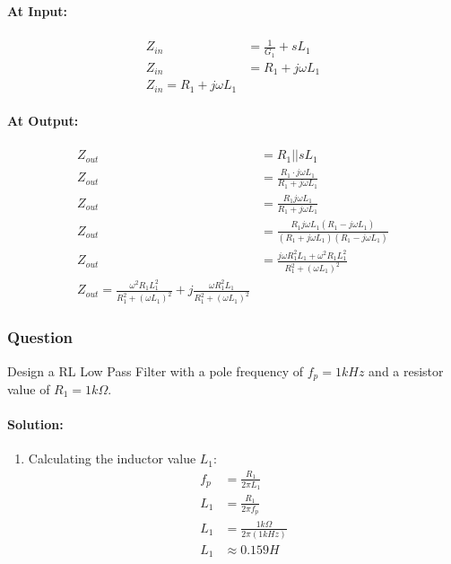 \begin{enumerate}
      \paragraph{At Input:}
        \begin{align*}
          Z_{in} &= \frac{1}{G_1} + s L_1 \\
          Z_{in} &= R_1 + j \omega L_1 \\
          \boxed{Z_{in} = R_1 + j \omega L_1}
        \end{align*}
      \paragraph{At Output:}
        \begin{align*}
          Z_{out} &= R_1 || s L_1 \\
          Z_{out} &= \frac{R_1 \cdot j \omega L_1}{R_1 + j \omega L_1} \\
          Z_{out} &= \frac{R_1 j \omega L_1}{R_1 + j \omega L_1} \\
          Z_{out} &= \frac{R_1 j \omega L_1 (R_1 - j \omega L_1)}{(R_1 + j \omega L_1)(R_1 - j \omega L_1)} \\
          Z_{out} &= \frac{j \omega R_1^2 L_1 + \omega^2 R_1 L_1^2}{R_1^2 + (\omega L_1)^2} \\
          \boxed{Z_{out} = \frac{\omega^2 R_1 L_1^2}{R_1^2 + (\omega L_1)^2} + j \frac{\omega R_1^2 L_1}{R_1^2 + (\omega L_1)^2}}
        \end{align*}
\end{enumerate}

\subsubsection{Question}
Design a RL Low Pass Filter with a pole frequency of
\(f_p = 1 kHz\) and a resistor value of \(R_1 = 1 k\Omega\).
\paragraph{Solution:}
\begin{enumerate}
  \item Calculating the inductor value \(L_1\):
    \begin{align*}
      f_p &= \frac{R_1}{2 \pi L_1} \\
      L_1 &= \frac{R_1}{2 \pi f_p} \\
      L_1 &= \frac{1 k\Omega}{2 \pi (1 kHz)} \\
      L_1 &\approx 0.159 H
    \end{align*}
\end{enumerate}
